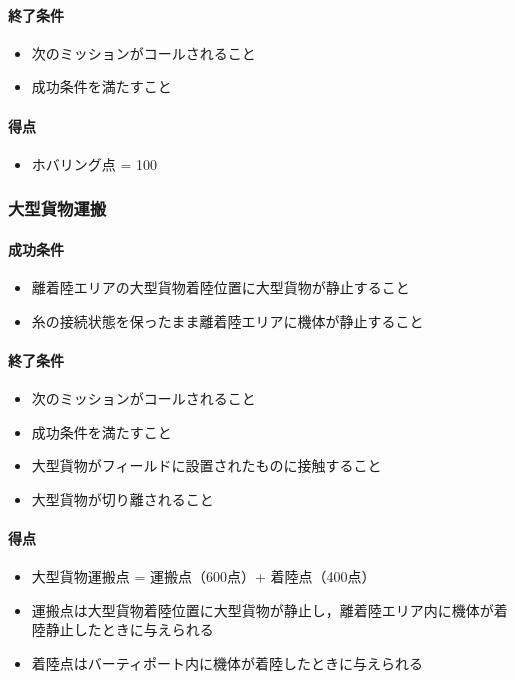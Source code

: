 \paragraph{終了条件}
\begin{itemize}
  \item 次のミッションがコールされること
  \item 成功条件を満たすこと
\end{itemize}
\paragraph{得点}
\begin{itemize}
  \item ホバリング点 = 100
\end{itemize}

\subsubsection{大型貨物運搬}
\paragraph{成功条件}
\begin{itemize}
  \item 離着陸エリアの大型貨物着陸位置に大型貨物が静止すること
  \item 糸の接続状態を保ったまま離着陸エリアに機体が静止すること
\end{itemize}
\paragraph{終了条件}
\begin{itemize}
  \item 次のミッションがコールされること
  \item 成功条件を満たすこと
  \item 大型貨物がフィールドに設置されたものに接触すること
  \item 大型貨物が切り離されること
\end{itemize}
\paragraph{得点}
\begin{itemize}
  \item 大型貨物運搬点 = 運搬点（600点）+ 着陸点（400点）
  \item 運搬点は大型貨物着陸位置に大型貨物が静止し，離着陸エリア内に機体が着陸静止したときに与えられる
  \item 着陸点はバーティポート内に機体が着陸したときに与えられる
\end{itemize}

